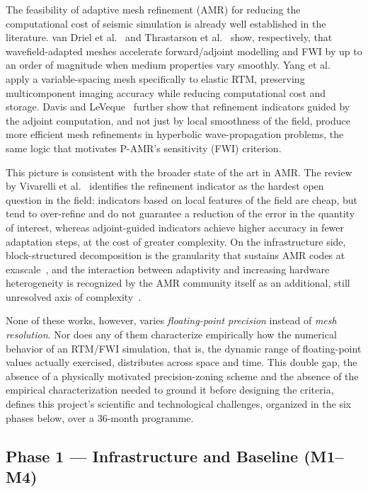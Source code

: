\documentclass[12pt,a4paper]{article}
\newcommand{\pamr}{P\nobreakdash-AMR}
\begin{document}
The feasibility of adaptive mesh refinement (AMR) for reducing the
computational cost of seismic simulation is already well established in
the literature. van Driel et al.~\cite{vandriel2020wavefield1} and
Thrastarson et al.~\cite{thrastarson2020wavefield2} show, respectively,
that wavefield-adapted meshes accelerate forward/adjoint modelling and FWI
by up to an order of magnitude when medium properties vary smoothly. Yang
et al.~\cite{yang2024elasticrtm} apply a variable-spacing mesh specifically
to elastic RTM, preserving multicomponent imaging accuracy while reducing
computational cost and storage. Davis and LeVeque~\cite{davis2015adjoint}
further show that refinement indicators guided by the adjoint computation,
and not just by local smoothness of the field, produce more efficient mesh
refinements in hyperbolic wave-propagation problems, the same logic that
motivates \pamr{}'s sensitivity (FWI) criterion.

This picture is consistent with the broader state of the art in AMR. The
review by Vivarelli et al.~\cite{vivarelli2025review} identifies the
refinement indicator as the hardest open question in the field: indicators
based on local features of the field are cheap, but tend to over-refine and
do not guarantee a reduction of the error in the quantity of interest,
whereas adjoint-guided indicators achieve higher accuracy in fewer
adaptation steps, at the cost of greater complexity. On the infrastructure
side, block-structured decomposition is the granularity that sustains AMR
codes at exascale~\cite{zhang2021amrex}, and the interaction between
adaptivity and increasing hardware heterogeneity is recognized by the AMR
community itself as an additional, still unresolved axis of
complexity~\cite{dubey2021portability}.

None of these works, however, varies \emph{floating-point precision}
instead of \emph{mesh resolution}. Nor does any of them characterize
empirically how the
numerical behavior of an RTM/FWI simulation, that is, the dynamic range of
floating-point values actually exercised, distributes across space and
time. This double gap, the absence of a physically motivated
precision-zoning scheme and the absence of the empirical characterization
needed to ground it before designing the criteria, defines this project's
scientific and technological challenges, organized in the six phases
below, over a 36-month programme.

\subsection{Phase 1 --- Infrastructure and Baseline (M1--M4)}
\end{document}

